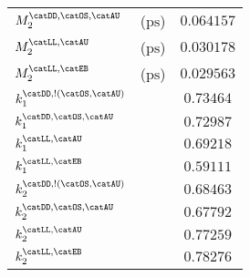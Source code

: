 \begin{table}[h]
\begin{tabular}{llr@{$\,\pm\,$}l}
  $M_2^\text{\catDD,\catOS,\catAU}$              & ($\si{\pico\second}$) & \multicolumn{2}{c}{$0.064157$}\\
  $M_2^\text{\catLL,\catAU}$                     & ($\si{\pico\second}$) & \multicolumn{2}{c}{$0.030178$}\\
  $M_2^\text{\catLL,\catEB}$                     & ($\si{\pico\second}$) & \multicolumn{2}{c}{$0.029563$}\\
  $k_1^\text{\catDD,!(\catOS,\catAU)}$           &                       & \multicolumn{2}{c}{$0.73464$}\\
  $k_1^\text{\catDD,\catOS,\catAU}$              &                       & \multicolumn{2}{c}{$0.72987$}\\
  $k_1^\text{\catLL,\catAU}$                     &                       & \multicolumn{2}{c}{$0.69218$}\\
  $k_1^\text{\catLL,\catEB}$                     &                       & \multicolumn{2}{c}{$0.59111$}\\
  $k_2^\text{\catDD,!(\catOS,\catAU)}$           &                       & \multicolumn{2}{c}{$0.68463$}\\
  $k_2^\text{\catDD,\catOS,\catAU}$              &                       & \multicolumn{2}{c}{$0.67792$}\\
  $k_2^\text{\catLL,\catAU}$                     &                       & \multicolumn{2}{c}{$0.77259$}\\
  $k_2^\text{\catLL,\catEB}$                     &                       & \multicolumn{2}{c}{$0.78276$}\\
  \bottomrule
\end{tabular}
\end{table}
%
